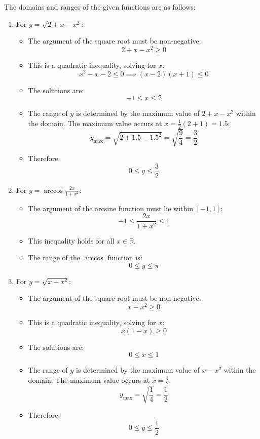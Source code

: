 \begin{solution}
The domains and ranges of the given functions are as follows:
\begin{enumerate}
    \item For \( y = \sqrt{2 + x - x^2} \):
    \begin{itemize}
        \item The argument of the square root must be non-negative:
        \[
        2 + x - x^2 \geq 0
        \]
        \item This is a quadratic inequality, solving for \( x \):
        \[
        x^2 - x - 2 \leq 0 \implies (x-2)(x+1) \leq 0
        \]
        \item The solutions are:
        \[
        -1 \leq x \leq 2
        \]
        \item The range of \( y \) is determined by the maximum value of \( 2 + x - x^2 \) within the domain. The maximum value occurs at \( x = \frac{1}{2}(2+1) = 1.5 \):
        \[
        y_{\max} = \sqrt{2 + 1.5 - 1.5^2} = \sqrt{\frac{9}{4}} = \frac{3}{2}
        \]
        \item Therefore:
        \[
        0 \leq y \leq \frac{3}{2}
        \]
    \end{itemize}

    \item For \( y = \arccos \frac{2x}{1+x^2} \):
    \begin{itemize}
        \item The argument of the arcsine function must lie within \([-1, 1]\):
        \[
        -1 \leq \frac{2x}{1+x^2} \leq 1
        \]
        \item This inequality holds for all \( x \in \mathbb{R} \).
        \item The range of the \( \arccos \) function is:
        \[
        0 \leq y \leq \pi
        \]
    \end{itemize}

    \item For \( y = \sqrt{x - x^2} \):
    \begin{itemize}
        \item The argument of the square root must be non-negative:
        \[
        x - x^2 \geq 0
        \]
        \item This is a quadratic inequality, solving for \( x \):
        \[
        x(1 - x) \geq 0
        \]
        \item The solutions are:
        \[
        0 \leq x \leq 1
        \]
        \item The range of \( y \) is determined by the maximum value of \( x - x^2 \) within the domain. The maximum value occurs at \( x = \frac{1}{2} \):
        \[
        y_{\max} = \sqrt{\frac{1}{4}} = \frac{1}{2}
        \]
        \item Therefore:
        \[
        0 \leq y \leq \frac{1}{2}
        \]
    \end{itemize}
\end{enumerate}
\end{solution}

